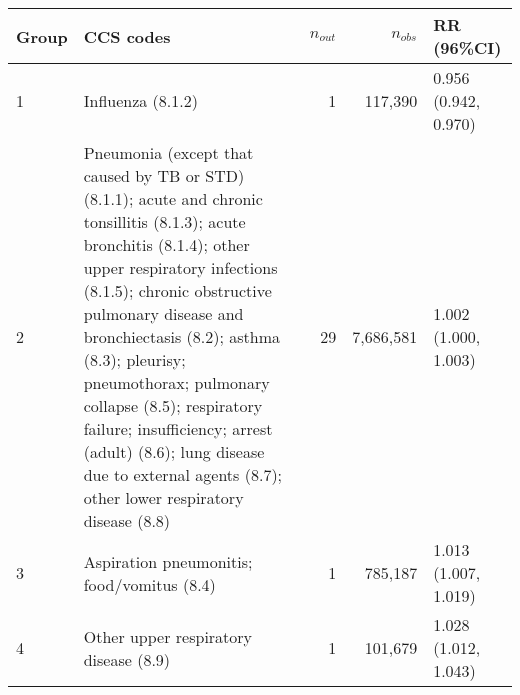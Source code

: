 \begin{tabular}{lp{6.5cm}rrp{2.2cm}}
  \hline
Group & CCS codes & $n_{out}$ & $n_{obs}$ & RR (96\%CI) \\ 
  \hline
   1 & Influenza (8.1.2) &    1 & 117,390 & 0.956 (0.942, 0.970) \\ 
     2 & Pneumonia (except that caused by TB or STD) (8.1.1); acute and chronic tonsillitis (8.1.3); acute bronchitis (8.1.4); other upper respiratory infections (8.1.5); chronic obstructive pulmonary disease and bronchiectasis (8.2); asthma (8.3); pleurisy; pneumothorax; pulmonary collapse (8.5); respiratory failure; insufficiency; arrest (adult) (8.6); lung disease due to external agents (8.7); other lower respiratory disease (8.8) &   29 & 7,686,581 & 1.002 (1.000, 1.003) \\ 
     3 & Aspiration pneumonitis; food/vomitus (8.4) &    1 & 785,187 & 1.013 (1.007, 1.019) \\ 
     4 & Other upper respiratory disease (8.9) &    1 & 101,679 & 1.028 (1.012, 1.043) \\ 
   \hline
\end{tabular}

